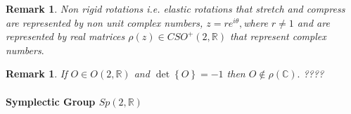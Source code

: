 \documentclass[aps,preprint]{revtex4}
\newtheorem{remark}[theorem]{Remark}
\begin{document}
\begin{remark}
Non rigid rotations i.e. elastic rotations that stretch and compress are
represented by non unit complex numbers, $z=re^{i\theta },$where $r\neq 1$
and are represented by real matrices $\rho \left( z\right) \in CSO^{+}\left(
2,\mathbb{R}\right) $ that represent complex numbers$.$
\end{remark}

\begin{remark}
If $O\in O\left( 2,\mathbb{R}\right) $ and $\det \left\{ O\right\} =-1$ then 
$O\notin \rho \left( \mathbb{C}\right) .$ ????
\end{remark}

\paragraph{Symplectic Group $Sp\left( 2,\mathbb{R}\right) $}
\end{document}
